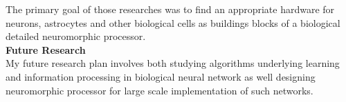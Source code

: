 \documentclass[12pt,oneside]{book}
\begin{document}
The primary goal of those researches was to find an appropriate hardware for neurons, astrocytes and other biological cells as buildings blocks of a biological detailed neuromorphic processor.\\
{\bf Future Research }\\
My future research plan involves
 both studying  algorithms underlying learning and information processing in biological neural network as well 
 designing neuromorphic processor for large scale implementation of such networks. 
%
%
%
%
\end{document}
